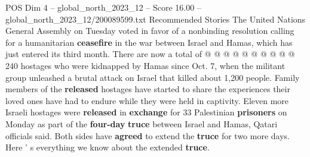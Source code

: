 \begin{textsample}{POS Dim 4 – global\_north\_2023\_12 – Score 16.00 – global\_north\_2023\_12/200089599.txt}
Recommended Stories The United Nations General Assembly on Tuesday voted in favor of a nonbinding resolution calling for a humanitarian \textbf{ceasefire} in the war between Israel and Hamas, which has just entered its third month.
There are now a total of @ @ @ @ @ @ @ @ @ @ 240 hostages who were kidnapped by Hamas since Oct. 7, when the militant group unleashed a brutal attack on Israel that killed about 1,200 people.
Family members of the \textbf{released} hostages have started to share the experiences their loved ones have had to endure while they were held in captivity.
Eleven more Israeli hostages were \textbf{released} in \textbf{exchange} for 33 Palestinian \textbf{prisoners} on Monday as part of the \textbf{four-day} \textbf{truce} between Israel and Hamas, Qatari officials said.
Both sides have \textbf{agreed} to extend the \textbf{truce} for two more days.
Here ' s everything we know about the extended \textbf{truce}.

\end{textsample}
